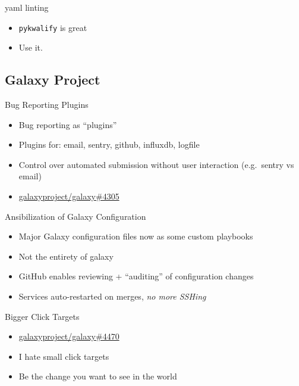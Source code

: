 \documentclass[12pt]{ufrslides}
\begin{document}
	\begin{frame}{yaml linting}
		\begin{itemize}
			\item \texttt{pykwalify} is great
			\item Use it.
		\end{itemize}
	\end{frame}

\subsection{Galaxy Project}
	\begin{frame}{Bug Reporting Plugins}
		\begin{itemize}
			\item Bug reporting as ``plugins''
			\item Plugins for: email, sentry, github, influxdb, logfile
			\item Control over automated submission without user interaction (e.g.~sentry vs email)
			\item \href{https://github.com/galaxyproject/galaxy/pull/4305}{galaxyproject/galaxy\#4305}
		\end{itemize}
	\end{frame}

	\begin{frame}{Ansibilization of Galaxy Configuration}
		\begin{itemize}
			\item Major Galaxy configuration files now as some custom playbooks
			\item Not the entirety of galaxy
			\item GitHub enables reviewing + ``auditing'' of configuration changes
			\item Services auto-restarted on merges, \emph{no more SSHing}
		\end{itemize}
	\end{frame}

	\begin{frame}{Bigger Click Targets}
		\begin{itemize}
			\item \href{https://github.com/galaxyproject/galaxy/pull/4470}{galaxyproject/galaxy\#4470}
			\item I hate small click targets
			\item Be the change you want to see in the world
		\end{itemize}
	\end{frame}
\end{document}
